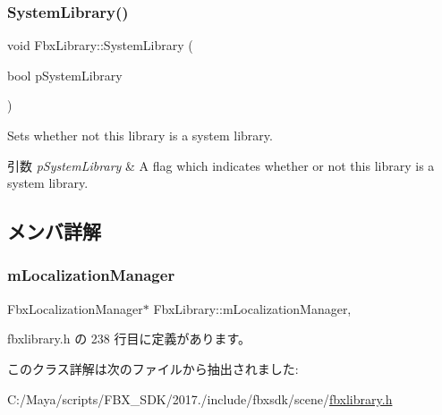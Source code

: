 \subsubsection{\texorpdfstring{System\+Library()}{SystemLibrary()}}
{\footnotesize\ttfamily void Fbx\+Library\+::\+System\+Library (\begin{DoxyParamCaption}\item[{bool}]{p\+System\+Library }\end{DoxyParamCaption})}

Sets whether not this library is a system library. 
\begin{DoxyParams}{引数}
{\em p\+System\+Library} & A flag which indicates whether or not this library is a system library. \\
\hline
\end{DoxyParams}


\subsection{メンバ詳解}
\mbox{\label{class_fbx_library_ac240173ce32053acf9cc390b82dc69e5}} 
\subsubsection{\texorpdfstring{m\+Localization\+Manager}{mLocalizationManager}}
{\footnotesize\ttfamily Fbx\+Localization\+Manager$\ast$ Fbx\+Library\+::m\+Localization\+Manager\hspace{0.3cm}{\ttfamily [mutable]}, {\ttfamily [protected]}}



 fbxlibrary.\+h の 238 行目に定義があります。



このクラス詳解は次のファイルから抽出されました\+:\begin{DoxyCompactItemize}
\item 
C\+:/\+Maya/scripts/\+F\+B\+X\+\_\+\+S\+D\+K/2017./include/fbxsdk/scene/\hyperlink{fbxlibrary_8h}{fbxlibrary.\+h}\end{DoxyCompactItemize}

